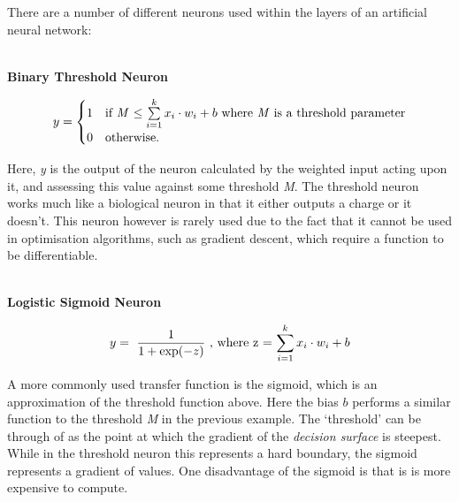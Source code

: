 \documentclass[a4paper,11pt,titlepage]{article}
\begin{document}
		There are a number of different neurons used within the layers of an artificial neural network:
		\\\
		
		\textbf{Binary Threshold Neuron} 
		
		$$
		y = \begin{cases}
		1 & \text{if \textit{M} $\le \sum\limits_{i=1}^k x_{i} \cdot w_{i} + b $ where \textit{M} is a threshold parameter} \\
		0 & \text{otherwise.}
		\end{cases}
		$$

		Here, \textit{y} is the output of the neuron calculated by the weighted input acting upon it, and assessing this value against some threshold \textit{M}. The threshold neuron works much like a biological neuron in that it either outputs a charge or it doesn't. This neuron however is rarely used due to the fact that it cannot be used in optimisation algorithms, such as gradient descent, which require a function to be differentiable. 
	\\\

		\textbf{Logistic Sigmoid Neuron}	
		
		$$
		y = 
		\text{ $ \frac{1}{1 + \exp (-z)} $
		, where z = $ \sum\limits_{i=1}^k x_{i} \cdot w_{i} + b $}
		$$ 
		
		A more commonly used transfer function is the sigmoid, which is an approximation of the threshold function above. Here the bias $ b $ performs a similar function to the threshold \textit{M} in the previous example. The `threshold' can be through of as the point at which the gradient of the \textit{decision surface} is steepest. While in the threshold neuron this represents a hard boundary, the sigmoid represents a gradient of values. One disadvantage of the sigmoid is that is is more expensive to compute.
		
		\begin{figure}[H]
    			\centering	
    			\qquad
    			\qquad
    			\caption{}%
    			\label{fig:SigmoidNeurons}
		\end{figure}
\end{document}
